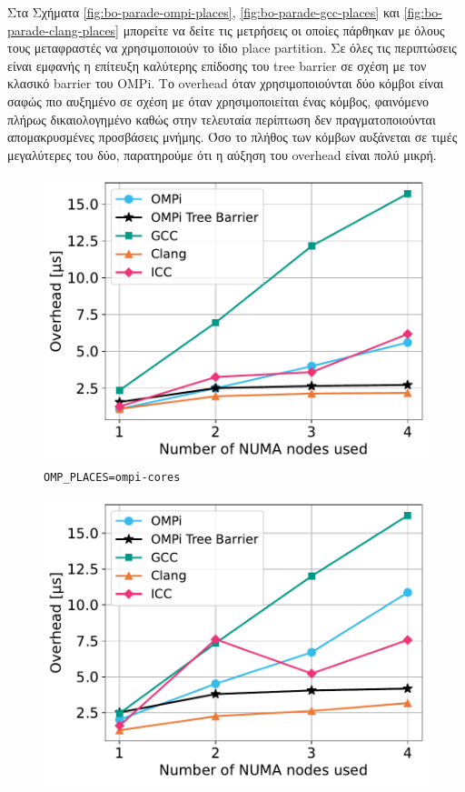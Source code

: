 Στα Σχήματα \ref{fig:bo-parade-ompi-places}, \ref{fig:bo-parade-gcc-places} και \ref{fig:bo-parade-clang-places} μπορείτε να δείτε τις μετρήσεις οι οποίες πάρθηκαν με όλους τους μεταφραστές να χρησιμοποιούν το ίδιο place partition. Σε όλες τις περιπτώσεις είναι εμφανής η επίτευξη καλύτερης επίδοσης του tree barrier σε σχέση με τον κλασικό barrier του OMPi. Το overhead όταν χρησιμοποιούνται δύο κόμβοι είναι σαφώς πιο αυξημένο σε σχέση με όταν χρησιμοποιείται ένας κόμβος, φαινόμενο πλήρως δικαιολογημένο καθώς στην τελευταία περίπτωση δεν πραγματοποιούνται απομακρυσμένες προσβάσεις μνήμης. Όσο το πλήθος των κόμβων αυξάνεται σε τιμές μεγαλύτερες του δύο, παρατηρούμε ότι η αύξηση του overhead είναι πολύ μικρή. %

\begin{figure}
    \centering
    \begin{minipage}{0.5\textwidth}
        \centering
        \includegraphics[width=1\textwidth]{Figures/epcc_20210823_175412/ompi-places_cores_close.pdf}
		\texttt{OMP\_PLACES=ompi-cores}
    \end{minipage}\hfill
    \begin{minipage}{0.5\textwidth}
        \centering
        \includegraphics[width=1\textwidth]{Figures/epcc_20210823_175412/ompi-places_threads_close.pdf}

\end{minipage}
\end{figure}
